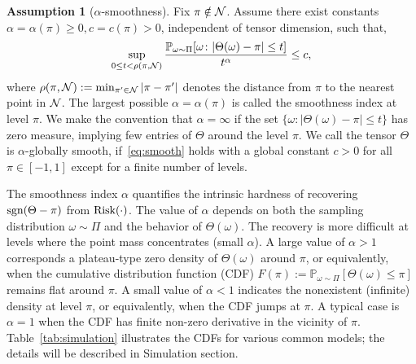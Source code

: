 \documentclass{article}
\theoremstyle{plain}
\theoremstyle{definition}
\newtheorem{assumption}{Assumption}
\def\sign{\textup{sgn}}
\def\risk{\textup{Risk}}
\begin{document}

\begin{assumption}[$\alpha$-smoothness]\label{ass:margin} 
Fix $\pi\notin \mathcal{N}$. Assume there exist constants $\alpha=\alpha(\pi)\geq 0, c=c(\pi) >0$, independent of tensor dimension, such that, 
\begin{equation}\label{eq:smooth}
\sup_{0\leq t<\rho(\pi, \mathcal{N})}{\mathbb{P}_{\omega \sim \Pi}[\omega \colon |\Theta (\omega)-\pi|\leq t ]\over t^\alpha} \leq c,
\end{equation}
where $\rho(\pi,\mathcal{N}):=\min_{\pi'\in \mathcal{N}}|\pi-\pi'|$ denotes the distance from $\pi$ to the nearest point in $\mathcal{N}$. The largest possible $\alpha=\alpha(\pi)$ is called the smoothness index at level $\pi$. We make the convention that $\alpha= \infty$ if the set $\{\omega\colon |\Theta(\omega)-\pi|\leq t\}$ has zero measure, implying few entries of $\Theta$ around the level $\pi$. We call the tensor $\Theta$ is $\alpha$-globally smooth, if~\eqref{eq:smooth} holds with a global constant $c>0$ for all $\pi\in[-1,1]$ except for a finite number of levels. 
\end{assumption}

The smoothness index $\alpha$ quantifies the intrinsic hardness of recovering $\sign(\Theta-\pi)$ from $\risk(\cdot)$. The value of $\alpha$ depends on both the sampling distribution $\omega\sim \Pi$ and the behavior of $\Theta(\omega)$. The recovery is more difficult at levels where the point mass concentrates (small $\alpha$). A large value of $\alpha>1$ corresponds a plateau-type zero density of $\Theta(\omega)$ around $\pi$, or equivalently, when the cumulative distribution function (CDF) $F(\pi):=\mathbb{P}_{\omega\sim \Pi}[\Theta(\omega)\leq \pi]$ remains flat around $\pi$. A small value of $\alpha<1$ indicates the nonexistent (infinite) density at level $\pi$, or equivalently, when the CDF jumps at $\pi$.  A typical case is $\alpha=1$ when the CDF has finite non-zero derivative in the vicinity of $\pi$. Table~\ref{tab:simulation} illustrates the CDFs for various common models; the details will be described in Simulation section. 
\end{document}
